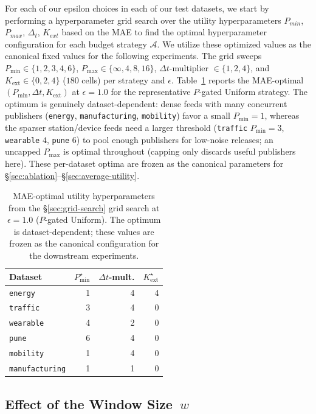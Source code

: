 For each of our epsilon choices in each of our test datasets, we start by performing a hyperparameter grid search over the utility hyperparameters $P_{min}$, $P_{max}$,  $\Delta_t$, $K_{ext}$ based on the MAE to find the optimal hyperparameter configuration for each budget strategy $\mathcal{A}$. We utilize these optimized values as the canonical fixed values for the following experiments. The grid sweeps $P_{\min}\!\in\!\{1,2,3,4,6\}$, $P_{\max}\!\in\!\{\infty,4,8,16\}$, $\Delta t$-multiplier $\in\!\{1,2,4\}$, and $K_{\text{ext}}\!\in\!\{0,2,4\}$ ($180$ cells) per strategy and $\epsilon$. Table~\ref{tab:grid} reports the MAE-optimal $(P_{\min},\Delta t,K_{\text{ext}})$ at $\epsilon=1.0$ for the representative $P$-gated Uniform strategy. The optimum is genuinely dataset-dependent: dense feeds with many concurrent publishers (\texttt{energy}, \texttt{manufacturing}, \texttt{mobility}) favor a small $P_{\min}\!=\!1$, whereas the sparser station/device feeds need a larger threshold (\texttt{traffic} $P_{\min}\!=\!3$, \texttt{wearable} $4$, \texttt{pune} $6$) to pool enough publishers for low-noise releases; an uncapped $P_{\max}$ is optimal throughout (capping only discards useful publishers here). These per-dataset optima are frozen as the canonical parameters for \S\ref{sec:ablation}--\S\ref{sec:average-utility}.

\begin{table}[t]
\centering
\footnotesize
\caption{MAE-optimal utility hyperparameters from the \S\ref{sec:grid-search} grid search at $\epsilon=1.0$ ($P$-gated Uniform). The optimum is dataset-dependent; these values are frozen as the canonical configuration for the downstream experiments.}\label{tab:grid}
\begin{tabular}{lrrr}
\toprule
Dataset & $P_{\min}^\star$ & $\Delta t$-mult. & $K_{\text{ext}}^\star$ \\
\midrule
\texttt{energy}        & 1 & 4 & 4 \\
\texttt{traffic}       & 3 & 4 & 0 \\
\texttt{wearable}      & 4 & 2 & 0 \\
\texttt{pune}          & 6 & 4 & 0 \\
\texttt{mobility}      & 1 & 4 & 0 \\
\texttt{manufacturing} & 1 & 1 & 0 \\
\bottomrule
\end{tabular}
\end{table}

\subsection{Effect of the Window Size~$w$}
\label{sec:exp-B}


